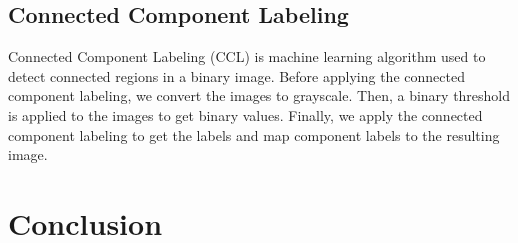 \subsection{Connected Component Labeling}
Connected Component Labeling (CCL) is machine learning algorithm used to detect connected regions in a binary image.
Before applying the connected component labeling, we convert the images to grayscale. Then, a binary threshold is applied to the images to get binary values.
Finally, we apply the connected component labeling to get the labels and map component labels to the resulting image.

\section{Conclusion}
\vspace{0.2in}
\hspace*{0.16in}

\newpage
